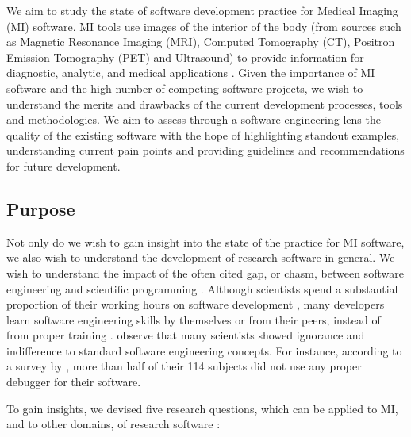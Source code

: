 \documentclass[preprint,12pt,authoryear]{elsarticle}
\begin{document}
We aim to study the state of software development practice for Medical Imaging
(MI) software.  MI tools use images of the interior of the body (from sources
such as Magnetic Resonance Imaging (MRI), Computed Tomography (CT), Positron
Emission Tomography (PET) and Ultrasound) to provide information for diagnostic,
analytic, and medical applications \citep{FDA2021, enwiki:1034887445,
Zhang2008}.  Given the importance of MI software and the high number of
competing software projects, we wish to understand the merits and drawbacks of
the current development processes, tools and methodologies.  We aim to assess
through a software engineering lens the quality of the existing software with
the hope of highlighting standout examples, understanding current pain points
and providing guidelines and recommendations for future development.

\subsection{Purpose} \label{sec_motivation}

Not only do we wish to gain insight into the state of the practice for MI
software, we also wish to understand the development of research software in
general. We wish to understand the impact of the often cited gap, or chasm,
between software engineering and scientific programming \citep{Storer2017}.
Although scientists spend a substantial proportion of their working hours on
software development \citep{Hannay2009, Prabhu2011}, many developers learn
software engineering skills by themselves or from their peers, instead of from
proper training \citep{Hannay2009}. \citet{Hannay2009} observe that many
scientists showed ignorance and indifference to standard software engineering
concepts. For instance, according to a survey by \citet{Prabhu2011}, more than
half of their 114 subjects did not use any proper debugger for their software.

To gain insights, we devised five research questions, which can be applied
to MI, and to other domains, of research software \citep{SmithEtAl2021}:
\end{document}
